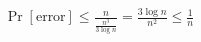 \documentclass[preview]{standalone}
\begin{document}
\begin{align*}
\Pr[\text{error}] \leq \frac{n}{\frac{n^3}{3 \log n}} = \frac{3 \log n}{n^2} \leq \frac{1}{n}
\end{align*}
\end{document}
